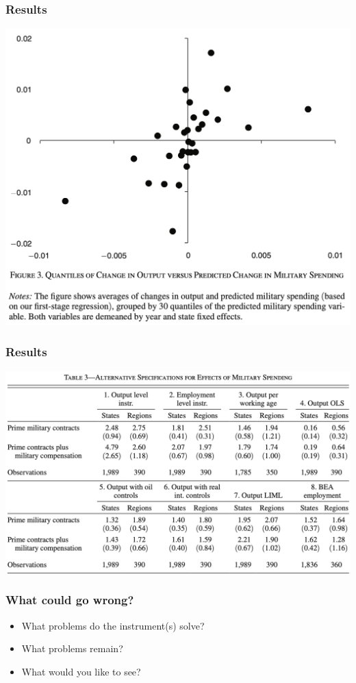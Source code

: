 \documentclass[english,xcolor=svgnames]{beamer}
\begin{document}
\begin{frame}
\frametitle[alignment=center]{Results}
\centering
\includegraphics[scale=0.5]{figures/NSFIG3.png}
\end{frame}

\begin{frame}
\frametitle[alignment=center]{Results}
\centering
\includegraphics[scale=0.5]{figures/NSTAB3.png}
\end{frame}

\begin{frame}
\frametitle[alignment=center]{What could go wrong?}
\begin{itemize}
	\item What problems do the instrument(s) solve?
	\item What problems remain?
	\item What would you like to see?
\end{itemize}
\end{frame}
\end{document}
